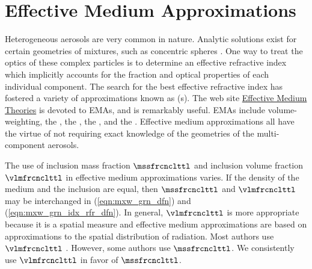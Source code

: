 \documentclass[12pt,twoside]{book}
\begin{document}
\section[Effective Medium Approximations]{Effective Medium Approximations}\label{sxn:ema}
Heterogeneous aerosols are very common in nature.
Analytic solutions exist for certain geometries of mixtures, such as
concentric spheres \cite[]{BoH83}.
One way to treat the optics of these complex particles is to determine
an effective refractive index which implicitly accounts for the
fraction and optical properties of each individual component. 
The search for the best effective refractive index has fostered a
variety of approximations known as 
 (s).
The web site
\href{http://www.mpia-hd.mpg.de/homes/henning/Dust_opacities/Opacities/Ralf/Eff/rules.html}{Effective Medium Theories}
is devoted to EMAs, and is remarkably useful.
EMAs include volume-weighting, 
the  \cite[]{MaG04}, 
the  \cite[]{Bru35}, 
the  \cite[]{BoH83},
and the  \cite[]{ViC98}.   
Effective medium approximations all have the virtue of not requiring
exact knowledge of the geometries of the multi-component aerosols.

The use of inclusion mass fraction $\mssfrcnclttl$ and inclusion volume
fraction $\vlmfrcnclttl$ in effective medium approximations varies.
If the density of the medium and the inclusion are equal, then
$\mssfrcnclttl$ and $\vlmfrcnclttl$ may be interchanged in
(\ref{eqn:mxw_grn_dfn}) and (\ref{eqn:mxw_grn_idx_rfr_dfn}).
In general, $\vlmfrcnclttl$ is more appropriate because it is a spatial
measure and effective medium approximations are based on
approximations to the spatial distribution of radiation.
Most authors use $\vlmfrcnclttl$ \cite[e.g.,][]{ViC98}.
However, some authors \cite[e.g.,][]{BoH83} use $\mssfrcnclttl$.
We consistently use $\vlmfrcnclttl$ in favor of $\mssfrcnclttl$.
\end{document}
